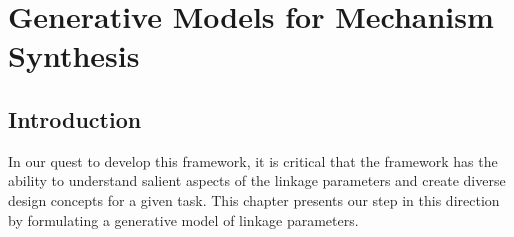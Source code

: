 \chapter{Generative Models for Mechanism Synthesis}\label{ch-generative-models}
\section{Introduction}
 

In our quest to develop this framework, it is critical that the framework has the ability to understand salient aspects of the linkage parameters and create diverse design concepts for a given task.  This chapter presents our step in this direction by formulating a generative model of linkage parameters.

